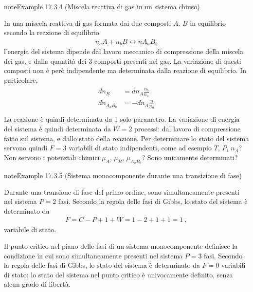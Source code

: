 \documentclass[letterpaper,10pt,italian]{jupyterBook}
\begin{document}
\label{ch/thermodynamics/principles-gibbs-phase-rule:example-7}
\begin{sphinxadmonition}{note}{Example 17.3.4 (Miscela reattiva di gas in un sistema chiuso)}



\sphinxAtStartPar
In una miscela reattiva di gas formata dai due composti \(A\), \(B\) in equilibrio secondo la reazione di equilibrio
\begin{equation*}
\begin{split}n_a A + n_b B \leftrightarrow n A_a B_b\end{split}
\end{equation*}
\sphinxAtStartPar
l’energia del sistema dipende dal lavoro meccanico di compressione della miscela dei gas, e dalla quantità dei 3 composti presenti nel gas. La variazione di questi composti non è però indipendente ma determinata dalla reazione di equilibrio. In particolare,
\begin{equation*}
\begin{split}\begin{aligned}
  d n_{B} & = d n_{A} \frac{n_b}{n_a} \\
  d n_{A_a B_b} & = - d n_{A} \frac{n}{n_a} \\
\end{aligned}\end{split}
\end{equation*}
\sphinxAtStartPar
La reazione è quindi determinata da 1 solo parametro. La variazione di energia del sistema è quindi determinata da \(W=2\) processi: dal lavoro di compressione fatto sul sistema, e dallo stato della reazione. Per determinare lo stato del sistema servono quindi \(F=3\) variabili di stato indipendenti, come ad esempio  \(T\), \(P\), \(n_A\)? Non servono i potenziali chimici \(\mu_A\), \(\mu_B\), \(\mu_{A_a B_b}\)? Sono unicamente determinati?
\end{sphinxadmonition}
\label{ch/thermodynamics/principles-gibbs-phase-rule:example-8}
\begin{sphinxadmonition}{note}{Example 17.3.5 (Sistema monocomponente durante una transizione di fase)}



\sphinxAtStartPar
{} Durante una transione di fase del primo ordine, sono simultaneamente presenti nel sistema \(P = 2\) fasi. Secondo la regola delle fasi di Gibbs, lo stato del sistema è determinato da
\begin{equation*}
\begin{split}F = C - P + 1 + W = 1 - 2 + 1 + 1 = 1 \ ,\end{split}
\end{equation*}
\sphinxAtStartPar
variabile di stato.

\sphinxAtStartPar
{} Il punto critico nel piano delle fasi di un sistema mono\sphinxhyphen{}componente definisce la condizione in cui sono simultaneamente presenti nel sistema \(P = 3\) fasi. Secondo la regola delle fasi di Gibbs, lo stato del sistema è determinato da \(F = 0\) variabili di stato: lo stato del sistema nel punto critico è univocamente definito, senza alcun grado di libertà.
\end{sphinxadmonition}
\end{document}
